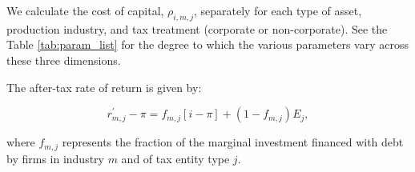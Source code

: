 \documentclass[article,11pt,letterpaper,fleqn]{article}
\theoremstyle{definition}
\numberwithin{equation}{section}
\begin{document}
We calculate the cost of capital, $\rho_{i,m,j}$, separately for each type of asset, production industry, and tax treatment (corporate or non-corporate).  See the Table \ref{tab:param_list} for the degree to which the various parameters vary across these three dimensions.  

The after-tax rate of return is given by:

\begin{equation}
r^{'}_{m,j}-\pi = f_{m,j}\left[i-\pi\right] + (1-f_{m,j})E_{j},
\end{equation}

\noindent\noindent where $f_{m,j}$ represents the fraction of the marginal investment financed with debt by firms in industry $m$ and of tax entity type $j$.



\end{document}
